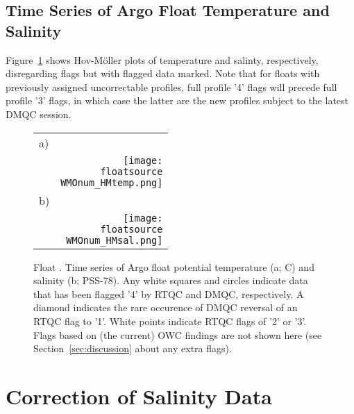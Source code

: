 \documentclass{article}
\begin{document}
\subsection{Time Series of Argo Float Temperature and Salinity}
%
Figure~\ref{fig:hovmoller} shows Hov-M{\"o}ller plots of temperature and
salinty, respectively, disregarding flags but with flagged data marked.
%
Note that for floats with previously assigned uncorrectable profiles, full
profile '4' flags will precede full profile '3' flags, in which case the
latter are the new profiles subject to the latest DMQC session.
%
\begin{figure}[H]
  \centering
  \begin{tabular}{lr}
  a) & \\
  &\texttt{[image: \\floatsource\\WMOnum\_HMtemp.png]}\\
  b)& \\
  &\texttt{[image: \\floatsource\\WMOnum\_HMsal.png]}
  \end{tabular}
  \caption{Float \WMOnum. Time series of Argo float potential temperature
    (a; \textdegree C) and salinity (b; PSS-78). Any white squares and
  circles indicate data that has been flagged '4' by RTQC and DMQC, respectively. 
  A diamond indicates the rare occurence of DMQC reversal of an RTQC flag to '1'.
  White points indicate RTQC flags of '2' or '3'. 
  Flags based on (the current) OWC findings are not shown here (see Section~\ref{sec:discussion} about any extra flags).}
\label{fig:hovmoller}
\end{figure}



\newpage
\section{Correction of Salinity Data}\label{sec:salcorrect}
%
\end{document}

